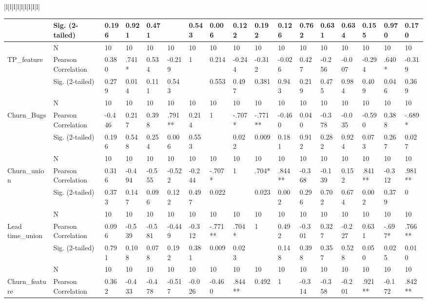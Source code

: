 \documentclass[UKenglish]{ifimaster}  %
\begin{document}
\begin{table}[!htbp]
\begin{adjustwidth}{-2.5cm}{}
{\begin{tabular}{|l|l|l|l|l|l|l|l|l|}
\begin{tabular}{ | l | l | l | l | l | l | l | l | l | l | l | l | l | l | l | l | l | }
	 & Sig. (2-tailed) & 0.196 & 0.921 & 0.471 &  & 0.543 & 0.006 & 0.122 & 0.192 & 0.126 & 0.762 & 0.631 & 0.634 & 0.155 & 0.970 & 0.170\\ \hline
	 & N & 10 & 10 & 10 & 10 & 10 & 10 & 10 & 10 & 10 & 10 & 10 & 10 & 10 & 10 & 10 \\ \hline
	TP\_feature & Pearson Correlation & 0.380 & .741* & 0.534 & -0.219 & 1 & 0.214 & -0.244 & -0.312 & -0.026 & 0.427 & -0.256 & -0.007 & -0.294 & .640* & -0.319\\ \hline
	 & Sig. (2-tailed) & 0.279 & 0.014 & 0.111 & 0.543 &  & 0.553 & 0.497 & 0.381 & 0.943 & 0.219 & 0.475 & 0.984 & 0.409 & 0.046 & 0.369\\ \hline
	 & N & 10 & 10 & 10 & 10 & 10 & 10 & 10 & 10 & 10 & 10 & 10 & 10 & 10 & 10 & 10 \\ \hline
	Churn\_Bugs & Pearson Correlation & -0.446 & 0.217 & 0.398 & .791** & 0.214 & 1 & -.707* & -.771** & -0.460 & 0.040 & -0.378 & -0.035 & -0.590 & 0.388 & -.689* \\ \hline
	 & Sig. (2-tailed) & 0.196 & 0.548 & 0.254 & 0.006 & 0.553 &  & 0.022 & 0.009 & 0.181 & 0.912 & 0.282 & 0.924 & 0.073 & 0.267 & 0.027\\ \hline
	 & N & 10 & 10 & 10 & 10 & 10 & 10 & 10 & 10 & 10 & 10 & 10 & 10 & 10 & 10 & 10 \\ \hline
	Churn\_union & Pearson Correlation & 0.316 & -0.494 & -0.555 & -0.522 & -0.244 & -.707* & 1 & .704* & .844** & -0.368 & -0.139 & 0.152 & .841** & -0.312 & .981** \\ \hline
	 & Sig. (2-tailed) & 0.373 & 0.147 & 0.096 & 0.122 & 0.497 & 0.022 &  & 0.023 & 0.002 & 0.296 & 0.702 & 0.674 & 0.002 & 0.379 & 0\\ \hline
	 & N & 10 & 10 & 10 & 10 & 10 & 10 & 10 & 10 & 10 & 10 & 10 & 10 & 10 & 10 & 10 \\ \hline
	Lead time\_union & Pearson Correlation & 0.096 & -0.539 & -0.581 & -0.449 & -0.312 & -.771** & .704* & 1 & 0.492 & -0.301 & 0.327 & -0.227 & 0.631 & -.697* & .766** \\ \hline
	 & Sig. (2-tailed) & 0.791 & 0.108 & 0.078 & 0.192 & 0.381 & 0.009 & 0.023 &  & 0.148 & 0.398 & 0.357 & 0.528 & 0.050 & 0.025 & 0.010\\ \hline
	 & N & 10 & 10 & 10 & 10 & 10 & 10 & 10 & 10 & 10 & 10 & 10 & 10 & 10 & 10 & 10 \\ \hline
	Churn\_feature & Pearson Correlation & 0.362 & -0.433 & -0.478 & -0.517 & -0.026 & -0.460 & .844** & 0.492 & 1 & -0.314 & -0.358 & -0.201 & .921** & -0.172 & .842** \\ \hline

\end{tabular}
\end{tabular}}
\end{adjustwidth}
\end{table}
\end{document}
